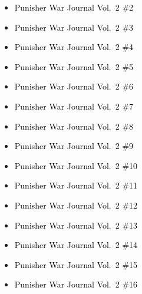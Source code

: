 \documentclass[12pt]{article}
\newcommand{\checkbox}{\raisebox{0.0ex}{\fbox{\rule{0ex}{1.5ex} \rule{1.5ex}{0ex}}}}
\begin{document}
\vspace{0.3cm}
\noindent
\begin{tcolorbox}[
  colback=white!95!gray,
  colframe=black,
  width=\textwidth,
  arc=4mm,
  auto outer arc,
  boxrule=0.8pt,
  left=8pt,right=8pt,top=8pt,bottom=8pt
]
\begin{itemize}[left=0pt,label={\checkbox}]
    \item \textcolor{black}{Punisher War Journal Vol.\ 2 \#2}
    \item \textcolor{black}{Punisher War Journal Vol.\ 2 \#3}
    \item \textcolor{black}{Punisher War Journal Vol.\ 2 \#4}
    \item \textcolor{black}{Punisher War Journal Vol.\ 2 \#5}
    \item \textcolor{black}{Punisher War Journal Vol.\ 2 \#6}
    \item \textcolor{black}{Punisher War Journal Vol.\ 2 \#7}
    \item \textcolor{black}{Punisher War Journal Vol.\ 2 \#8}
    \item \textcolor{black}{Punisher War Journal Vol.\ 2 \#9}
    \item \textcolor{black}{Punisher War Journal Vol.\ 2 \#10}
    \item \textcolor{black}{Punisher War Journal Vol.\ 2 \#11}
    \item \textcolor{black}{Punisher War Journal Vol.\ 2 \#12}
    \item \textcolor{black}{Punisher War Journal Vol.\ 2 \#13}
    \item \textcolor{black}{Punisher War Journal Vol.\ 2 \#14}
    \item \textcolor{black}{Punisher War Journal Vol.\ 2 \#15}
    \item \textcolor{black}{Punisher War Journal Vol.\ 2 \#16}
\end{itemize}
\end{tcolorbox}

\newpage
{}
\end{document}
